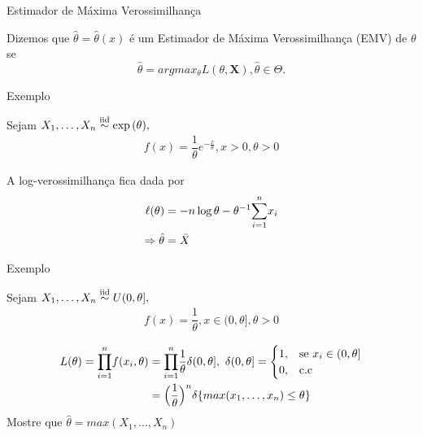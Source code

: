 \documentclass[12pt]{beamer}
\begin{document}
\begin{frame}{Estimador de Máxima Verossimilhança}
\begin{definicao}\label{def6}
Dizemos que $\hat{\theta}=\hat{\theta}(x)$ é um Estimador de Máxima Verossimilhança (EMV) de $\theta$ se  $$\hat{\theta}=argmax_{\theta} L(\theta,\boldsymbol{X}), \hat{\theta}\in \Theta.$$
\end{definicao}
\end{frame}

\begin{frame}{Exemplo}
\begin{block}{}
\justifying
Sejam $X_{1},\ldots,X_{n}\overset{\text{iid}}{\sim} \exp{(\theta)},$ 
\begin{align*}
    f(x)=\dfrac{1}{\theta}e^{-\frac{x}{\theta}},x>0,\theta>0
\end{align*}
\end{block}
\pause
\begin{block}{}
\justifying
A log-verossimilhança fica dada por 
\begin{align*}
    \ell(\theta)&=-n\log{\theta}-\theta^{-1}{\displaystyle \sum_{i=1}^{n}} x_{i}\\
    \Rightarrow \hat{\theta}&=\Bar{X}
\end{align*}
\end{block}
\end{frame}

\begin{frame}{Exemplo}
\vspace{-0.3cm}
\begin{block}{}
\justifying
Sejam $X_{1},\ldots,X_{n}\overset{\text{iid}}{\sim} U(0,\theta],$ 
\begin{align*}
    f(x)=\dfrac{1}{\theta},x\in(0,\theta],\theta>0
\end{align*}
\end{block}
\pause
\begin{block}{\Home}
\justifying
\begin{align*}
L(\theta)={\displaystyle \prod_{i=1}^{n}} f(x_{i},\theta)&={\displaystyle \prod_{i=1}^{n}}\dfrac{1}{\theta}\delta(0,\theta],~\delta(0,\theta]=\begin{cases}
			1, & \text{se $x_{i}\in(0,\theta]$}\\
            0, & \text{c.c}
		 \end{cases}\\
   &=\Big(\dfrac{1}{\theta}\Big)^{n}\delta\{max(x_{1},\ldots,x_{n})\leq \theta\}
\end{align*}
Mostre que $\hat{\theta}=max(X_{1},\ldots,X_{n})$
\end{block}
\end{frame}
\end{document}
